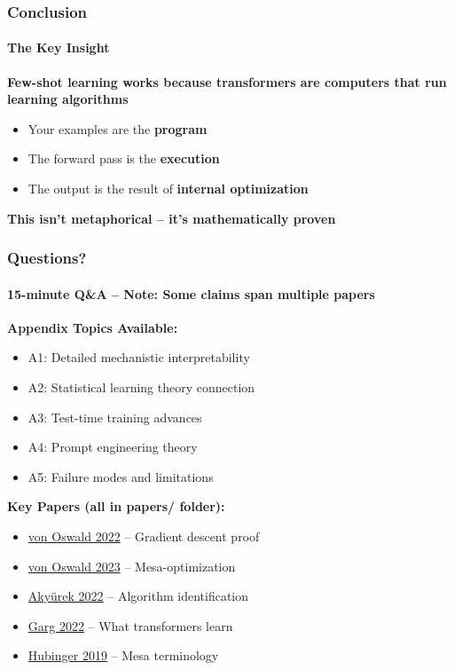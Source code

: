 \documentclass[10pt,aspectratio=169]{beamer}
\begin{document}
\begin{frame}
\frametitle{Conclusion}
\framesubtitle{The Key Insight}

\begin{center}
\Large
\textbf{Few-shot learning works because transformers are computers that run learning algorithms}
\end{center}

\vspace{1cm}

\begin{itemize}
    \item Your examples are the \textbf{program}
    \item The forward pass is the \textbf{execution}
    \item The output is the result of \textbf{internal optimization}
\end{itemize}

\vspace{1cm}

\begin{center}
\textbf{This isn't metaphorical -- it's mathematically proven}
\end{center}
\end{frame}


\begin{frame}
\frametitle{Questions?}
\framesubtitle{15-minute Q\&A -- Note: Some claims span multiple papers}

\Large
\textbf{Appendix Topics Available:}

\normalsize
\begin{itemize}
    \item A1: Detailed mechanistic interpretability
    \item A2: Statistical learning theory connection
    \item A3: Test-time training advances
    \item A4: Prompt engineering theory
    \item A5: Failure modes and limitations
\end{itemize}

\vspace{0.5cm}
\textbf{Key Papers (all in papers/ folder):}
\begin{itemize}
    \item \href{papers/2212.07677_transformers_gradient_descent.pdf}{\color{blue}von Oswald 2022} -- Gradient descent proof
    \item \href{papers/2309.05858_mesa_optimization.pdf}{\color{blue}von Oswald 2023} -- Mesa-optimization
    \item \href{papers/2211.15661_learning_algorithm.pdf}{\color{blue}Akyürek 2022} -- Algorithm identification  
    \item \href{papers/2208.01066_what_can_transformers_learn.pdf}{\color{blue}Garg 2022} -- What transformers learn
    \item \href{papers/1906.01820_risks_learned_optimization.pdf}{\color{blue}Hubinger 2019} -- Mesa terminology
\end{itemize}
\end{frame}
\end{document}
